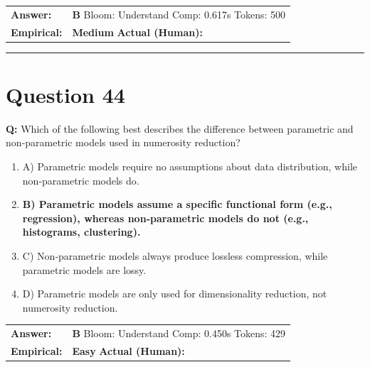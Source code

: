 \documentclass[9pt]{article}
\begin{document}
\begin{tabular}{@{}l p{10.5cm}@{}}
\textbf{Answer:} & \textbf{B} \hspace{1em} Bloom: Understand \hspace{1em} Comp: 0.617s \hspace{1em} Tokens: 500 \\
\textbf{Empirical:} & \textbf{Medium} \hspace{1em} \textbf{Actual (Human):} \underline{\hspace{5cm}}
\end{tabular}

\vspace{0.2cm}
\rule{\textwidth}{0.4pt}
\vspace{0.2cm}


\section*{Question 44}

\textbf{Q:} Which of the following best describes the difference between parametric and non‑parametric models used in numerosity reduction?

\begin{enumerate}[label=\textbf{\alph{*})}, nosep]
    \item A) Parametric models require no assumptions about data distribution, while non‑parametric models do.
    \item \textbf{B) Parametric models assume a specific functional form (e.g., regression), whereas non‑parametric models do not (e.g., histograms, clustering).} %
    \item C) Non‑parametric models always produce lossless compression, while parametric models are lossy.
    \item D) Parametric models are only used for dimensionality reduction, not numerosity reduction.

\end{enumerate}

\begin{tabular}{@{}l p{10.5cm}@{}}
\textbf{Answer:} & \textbf{B} \hspace{1em} Bloom: Understand \hspace{1em} Comp: 0.450s \hspace{1em} Tokens: 429 \\
\textbf{Empirical:} & \textbf{Easy} \hspace{1em} \textbf{Actual (Human):} \underline{\hspace{5cm}}
\end{tabular}
\end{document}
